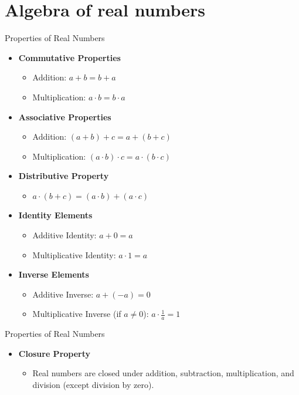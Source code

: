 \documentclass{beamer}
\begin{document}
\section{Algebra of real numbers}
\begin{frame}{Properties of Real Numbers}
  \begin{itemize}
      \item \textbf{Commutative Properties}
      \begin{itemize}
          \item Addition: $a + b = b + a$
          \item Multiplication: $a \cdot b = b \cdot a$
      \end{itemize}
      \vspace{5pt}

      \item \textbf{Associative Properties}
      \begin{itemize}
          \item Addition: $(a + b) + c = a + (b + c)$
          \item Multiplication: $(a \cdot b) \cdot c = a \cdot (b \cdot c)$
      \end{itemize}
      \vspace{5pt}
      \item \textbf{Distributive Property}
      \begin{itemize}
          \item $a \cdot (b + c) = (a \cdot b) + (a \cdot c)$
      \end{itemize}
      \vspace{5pt}
      \item \textbf{Identity Elements}
      \begin{itemize}
          \item Additive Identity: $a + 0 = a$
          \item Multiplicative Identity: $a \cdot 1 = a$
      \end{itemize}
      \vspace{5pt}
      \item \textbf{Inverse Elements}
      \begin{itemize}
          \item Additive Inverse: $a + (-a) = 0$
          \item Multiplicative Inverse (if $a \neq 0$): $a \cdot \frac{1}{a} = 1$
      \end{itemize}
    \end{itemize}
    \end{frame}
    \begin{frame}{Properties of Real Numbers}
    \begin{itemize}
      \vspace{5pt}
      \item \textbf{Closure Property}
      \begin{itemize}
          \item Real numbers are closed under addition, subtraction, multiplication, and division (except division by zero).
      \end{itemize}
  \end{itemize}
  \end{frame}
\end{document}
